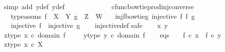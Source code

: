 \begin{isabellebody}
\ {\isacharparenleft}{\kern0pt}simp\ add{\isacharcolon}{\kern0pt}\ y{}{\isacharunderscore}{\kern0pt}def\ y{}{\isacharunderscore}{\kern0pt}def{\isacharparenright}{\kern0pt}\isanewline
\ \ \ \ \ \ \isamarkupfalse%
\isanewline
\ \ \ \isamarkupfalse%
\isanewline
\ \isamarkupfalse%
%
\endisatagproof
{\isafoldproof}%
%
\isadelimproof
\isanewline
%
\endisadelimproof
\isanewline
{}\isamarkupfalse%
\ cfunc{\isacharunderscore}{\kern0pt}bowtieprod{\isacharunderscore}{\kern0pt}inj{\isacharunderscore}{\kern0pt}converse{\isacharcolon}{\kern0pt}\isanewline
\ \ \ type{\isacharunderscore}{\kern0pt}assms{\isacharcolon}{\kern0pt}\ {\isachardoublequoteopen}f\ {\isacharcolon}{\kern0pt}\ X\ {\isasymrightarrow}\ Y{\isachardoublequoteclose}\ {\isachardoublequoteopen}g\ {\isacharcolon}{\kern0pt}\ Z\ {\isasymrightarrow}\ W{\isachardoublequoteclose}\isanewline
\ \ \ inj{\isacharunderscore}{\kern0pt}f{\isacharunderscore}{\kern0pt}bowtie{\isacharunderscore}{\kern0pt}g{\isacharcolon}{\kern0pt}\ {\isachardoublequoteopen}injective\ {\isacharparenleft}{\kern0pt}f\ {\isasymbowtie}\isactrlsub f\ g{\isacharparenright}{\kern0pt}{\isachardoublequoteclose}\isanewline
\ \ \ {\isachardoublequoteopen}injective\ f\ {\isasymand}\ injective\ g{\isachardoublequoteclose}\isanewline
%
\isadelimproof
\ \ %
\endisadelimproof
%
\isatagproof
{}\isamarkupfalse%
\ injective{\isacharunderscore}{\kern0pt}def\isanewline
{}\isamarkupfalse%
{\isacharparenleft}{\kern0pt}safe{\isacharparenright}{\kern0pt}\isanewline
\ \ \isamarkupfalse%
\ x\ y\ \isanewline
\ \ \isamarkupfalse%
\ x{\isacharunderscore}{\kern0pt}type{\isacharcolon}{\kern0pt}\ {\isachardoublequoteopen}x\ {\isasymin}\isactrlsub c\ domain\ f{\isachardoublequoteclose}\ \isanewline
\ \ \isamarkupfalse%
\ y{\isacharunderscore}{\kern0pt}type{\isacharcolon}{\kern0pt}\ {\isachardoublequoteopen}y\ {\isasymin}\isactrlsub c\ domain\ f{\isachardoublequoteclose}\isanewline
\ \ \isamarkupfalse%
\ eqs{\isacharcolon}{\kern0pt}\ \ \ \ {\isachardoublequoteopen}f\ {\isasymcirc}\isactrlsub c\ x\ {\isacharequal}{\kern0pt}\ f\ {\isasymcirc}\isactrlsub c\ y{\isachardoublequoteclose}\isanewline
\isanewline
\ \ \isamarkupfalse%
\ x{\isacharunderscore}{\kern0pt}type{}{\isacharcolon}{\kern0pt}\ {\isachardoublequoteopen}x\ {\isasymin}\isactrlsub c\ X{\isachardoublequoteclose}\isanewline
\ \ \ \ \isamarkupfalse%

\end{isabellebody}
